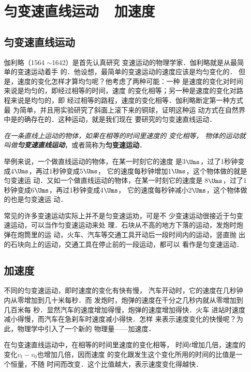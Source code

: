 \section{匀变速直线运动~~加速度}
    \subsection{匀变速直线运动}
    
    伽利略（1564 $\sim$1642）是首先认真研究
变速运动的物理学家．伽利略就是从最简单的变速运动着手
的．他设想，最简单的变速运动的速度应该是均匀变化的．
但是，速度的变化怎样才算均匀呢？他考虑了两种可能：一种
是速度的变化对时间来说是均匀的，即经过相等的时间，速度
的变化相等；另一种是速度的变化对路程来说是均匀的，即
经过相等的路程，速度的变化相等．伽利略断定第一种方式最
为简单，并且用实验研究了斜面上滚下来的铜球，证明这种运
动方式在自然界中是的确存在的．这种运动，就是我们现在
要研究的匀变速直线运动．

\textit{在一条直线上运动的物体，如果在相等的时间里速度的
变化相等，
物体的运动就叫做\textbf{匀变速直线运动}}，或者简称为\textbf{匀变速运动}．

举例来说，一个做直线运动的物体，在某一时刻它的速度
是3$\Ums$，过了1秒钟变成4$\Ums$，再过1秒钟变成5$\Ums$，
它的速度每秒钟增加1$\Ums$，这个物体做的就是匀变速运
动．又如一个做直线运动的物体，在某一时刻它的速度是
8$\Ums$，过了1秒钟变成6$\Ums$，再过1秒钟变成4$\Ums$，
它的速度每秒钟减小2$\Ums$，这个物体做的也是匀变速运
动．

    常见的许多变速运动实际上并不是匀变速运劝，可是不
少变速运动很接近于匀变速运动，可以当作匀变速运动来处
理．石块从不高的地方下落的运动，发炮时炮弹在炮筒里的运
动，火车、汽车等交通工具开动后一段时间内的运动，竖直抛
出的石块向上的运动，交通工具在停止前的一段运动，都可以
看作是匀变速运动．

\subsection{加速度}
不同的匀变速运动，即时速度的变化有快有慢，
汽车开动时，它的速度在几秒钟内从零增加到几十米每秒．而
发炮时，炮弹的速度在千分之几秒内就从零增加到几百米每
秒．显然汽车的速度增加得慢，炮弹的速度增加得快．火车
进站时速度减小得慢，而汽车在急刹车时速度减小得快．怎样
来表示速度变化的快慢呢？为此，物理学中引入了一个新的
物理量——加速度．

在匀变速直线运动中，在相等的时间里速度的变化相等，
时间$t$增加几倍，速度的变化$v_t-v_0$也增加几倍，因而速度
的变化跟发生这个变化所用的时间的比值是一个恒量，不随
时间而改变．这个比值越大，表示速度变化得越快．

